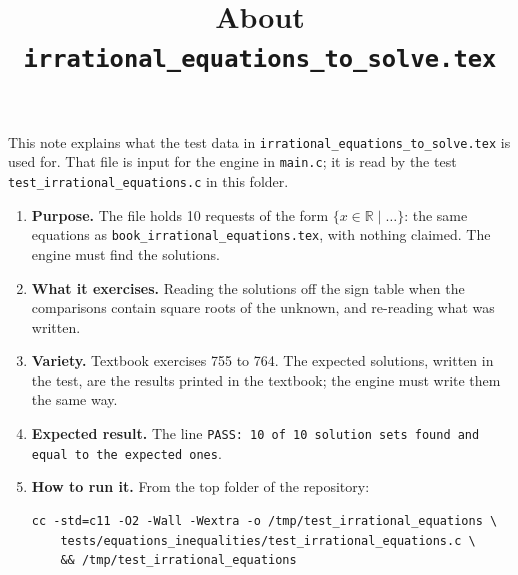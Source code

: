 \documentclass[11pt,a4paper]{article}
\title{About \texttt{irrational\_equations\_to\_solve.tex}}
\author{}
\date{}
\begin{document}
\maketitle
This note explains what the test data in \texttt{irrational\_equations\_to\_solve.tex} is used for. That file is input for the engine in \texttt{main.c}; it is read by the test \texttt{test\_irrational\_equations.c} in this folder.

\begin{enumerate}
\item \textbf{Purpose.} The file holds 10 requests of the form $\{x \in \mathbb{R} \mid \ldots\}$: the same equations as \texttt{book\_irrational\_equations.tex}, with nothing claimed. The engine must find the solutions.

\item \textbf{What it exercises.} Reading the solutions off the sign table when the comparisons contain square roots of the unknown, and re-reading what was written.

\item \textbf{Variety.} Textbook exercises 755 to 764. The expected solutions, written in the test, are the results printed in the textbook; the engine must write them the same way.

\item \textbf{Expected result.} The line \texttt{PASS: 10 of 10 solution sets found and equal to the expected ones}.

\item \textbf{How to run it.} From the top folder of the repository:
\begin{verbatim}
cc -std=c11 -O2 -Wall -Wextra -o /tmp/test_irrational_equations \
    tests/equations_inequalities/test_irrational_equations.c \
    && /tmp/test_irrational_equations
\end{verbatim}
\end{enumerate}
\end{document}
